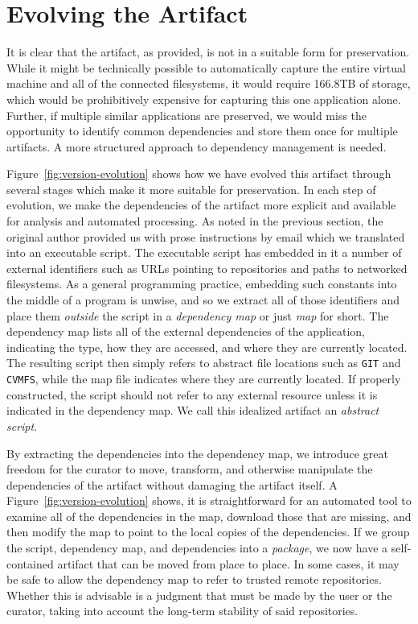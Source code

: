 \documentclass{sig-alternate}
\begin{document}
\fi

\section{Evolving the Artifact}

It is clear that the artifact, as provided, is not in a suitable form
for preservation.  While it might be technically possible to automatically
capture the entire virtual machine and all of the connected filesystems,
it would require 166.8TB of storage, which would be prohibitively expensive
for capturing this one application alone.  Further, if multiple
similar applications are preserved, we would miss the opportunity to identify
common dependencies and store them once for multiple artifacts.
A more structured approach to dependency management is needed.

Figure~\ref{fig:version-evolution} shows how we have evolved this artifact
through several stages which make it more suitable for preservation.
In each step of evolution, we make the dependencies of the artifact
more explicit and available for analysis and automated processing.
As noted in the previous section, the original author provided us with
prose instructions by email which we translated into an
executable script.  The executable script has embedded in it
a number of external identifiers such as URLs pointing to repositories
and paths to networked filesystems.  As a general programming practice,
embedding such constants into the middle of a program is unwise, and so
we extract all of those identifiers and place them \emph{outside} the
script in a \emph{dependency map} or just \emph{map} for short.
The dependency map lists all of the external dependencies of the application, indicating
the type, how they are accessed, and where they are currently located.
The resulting script then simply refers to abstract file locations such
as \verb$GIT$ and \verb$CVMFS$, while the map file indicates where they
are currently located. If properly constructed, the script should not refer to any external
resource unless it is indicated in the dependency map.  We call this idealized
artifact an \emph{abstract script}.

By extracting the dependencies into the dependency map,
we introduce great freedom for the curator to move, transform, and otherwise
manipulate the dependencies of the artifact without damaging the artifact itself.
A Figure~\ref{fig:version-evolution} shows, it is straightforward for an
automated tool to examine
all of the dependencies in the map, download those that are missing,
and then modify the map to point to the local copies of the dependencies.
If we group the script, dependency map, and dependencies into a \emph{package},
we now have a self-contained artifact that can be moved from place to place.
In some cases, it may be safe to allow the dependency map to refer to 
trusted remote repositories.  Whether this is advisable is a judgment that
must be made by the user or the curator, taking into account the long-term
stability of said repositories.
\end{document}
